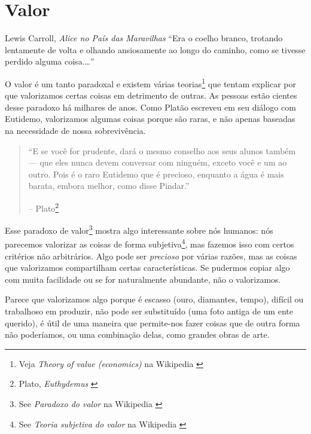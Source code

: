 \chapter{Valor}
\label{les:10}

\begin{chapquote}{Lewis Carroll, \textit{Alice no País das Maravilhas}}
\enquote{Era o coelho branco, trotando lentamente de volta e olhando ansiosamente
ao longo do caminho, como se tivesse perdido alguma coisa.\ldots}
\end{chapquote}

O valor é um tanto paradoxal e existem várias teorias\footnote{Veja
\textit{Theory of value (economics)} na Wikipedia \cite{wiki:theory-of-value}}
que tentam explicar por que valorizamos certas coisas em detrimento de outras. 
As pessoas estão cientes desse paradoxo há milhares de anos. Como Platão 
escreveu em seu diálogo com Eutidemo, valorizamos algumas coisas porque 
são raras, e não apenas baseadas na necessidade de nossa sobrevivência.

\begin{quotation}\begin{samepage}
\enquote{E se você for prudente, dará o mesmo conselho aos seus alunos
também --- que eles nunca devem conversar com ninguém, exceto você e
um ao outro. Pois é o raro Eutidemo que é precioso, enquanto
a água é mais barata, embora melhor, como disse Pindar.}
\begin{flushright} -- Plato\footnote{Plato, \textit{Euthydemus} \cite{euthydemus}}
\end{flushright}\end{samepage}\end{quotation}

Esse paradoxo de valor\footnote{See \textit{Paradoxo do valor} na Wikipedia
\cite{wiki:paradox-of-value}} mostra algo interessante sobre nós humanos: nós
parecemos valorizar as coisas de forma subjetiva\footnote{See \textit{Teoria subjetiva 
do valor} na Wikipedia \cite{wiki:subjective-theory-of-value}}, mas fazemos isso com 
certos critérios não arbitrários. Algo pode ser \textit{precioso} por várias razões, 
mas as coisas que valorizamos compartilham certas características. Se pudermos copiar 
algo com muita facilidade ou se for naturalmente abundante, não o valorizamos.

Parece que valorizamos algo porque é escasso (ouro, diamantes, tempo), difícil ou 
trabalhoso em produzir, não pode ser substituído (uma foto antiga de um ente querido), 
é útil de uma maneira que permite-nos fazer coisas que de outra forma não poderíamos, 
ou uma combinação delas, como grandes obras de arte.

